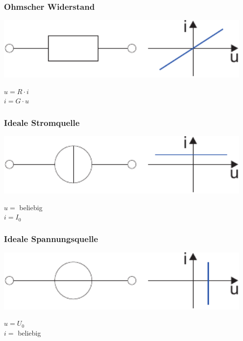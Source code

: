 \documentclass[a4paper,twocolumn,10pt]{article}
\begin{document}
\subsubsection*{Ohmscher Widerstand}
\begin{minipage}[b]{0.26\textwidth}
\includegraphics[width=0.95\textwidth]{Grafiken/Widerstand}
\end{minipage}
\hfill
\begin{minipage}[b]{0.2\textwidth}
$u=R\cdot i$\\
$i=G\cdot u$
\end{minipage}

\subsubsection*{Ideale Stromquelle}
\begin{minipage}[b]{0.26\textwidth}
\includegraphics[width=0.95\textwidth]{Grafiken/Stromquelle}
\end{minipage}
\hfill
\begin{minipage}[b]{0.2\textwidth}
$u=$ beliebig\\
$i=I_0$
\end{minipage}

\subsubsection*{Ideale Spannungsquelle}
\begin{minipage}[b]{0.26\textwidth}
\includegraphics[width=0.95\textwidth]{Grafiken/Spannungsquelle}
\end{minipage}
\hfill
\begin{minipage}[b]{0.2\textwidth}
$u=U_0$\\
$i=$ beliebig
\end{minipage}
\end{document}
